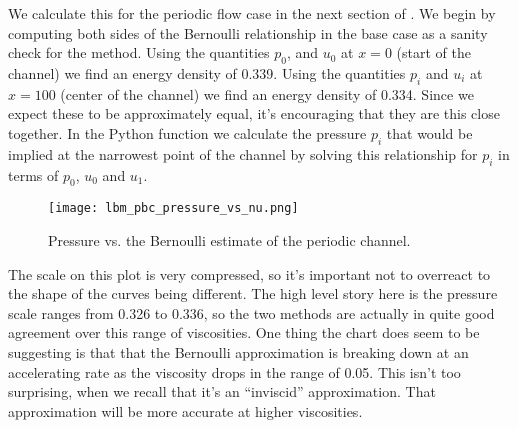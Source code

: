 We calculate this for the periodic flow case in the next section of .
We begin by computing both sides of the Bernoulli relationship in the base case as a sanity check for the method.
Using the quantities $p_0$, and $u_0$ at $x=0$ (start of the channel) we find an energy density of 0.339.
Using the quantities $p_i$ and $u_i$ at $x=100$ (center of the channel) we find an energy density of 0.334.
Since we expect these to be approximately equal, it's encouraging that they are this close together.
In the Python function  we calculate the pressure $p_i$ that would be implied
at the narrowest point of the channel by solving this relationship for $p_i$ in terms of $p_0$, $u_0$ and $u_1$.

\begin{figure}[H]
    \centering
    \texttt{[image: lbm\_pbc\_pressure\_vs\_nu.png]}
    \caption{Pressure vs. the Bernoulli estimate of the periodic channel.}
\end{figure}

The scale on this plot is very compressed, so it's important not to overreact to the shape of the curves being different.
The high level story here is the pressure scale ranges from 0.326 to 0.336, so the two methods are actually
in quite good agreement over this range of viscosities.
One thing the chart does seem to be suggesting is that that the Bernoulli approximation is breaking down at an
accelerating rate as the viscosity drops in the range of 0.05.
This isn't too surprising, when we recall that it's an ``inviscid'' approximation.
That approximation will be more accurate at higher viscosities.
